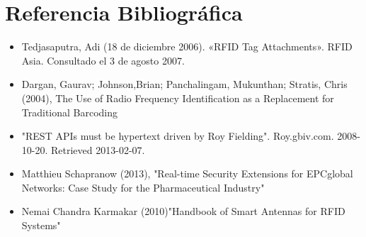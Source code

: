 \documentclass[11pt,twocolumn]{article}
\begin{document}
\section{Referencia Bibliogr\'afica}
	
	\begin{itemize}
		\item  Tedjasaputra, Adi (18 de diciembre 2006). «RFID Tag Attachments». RFID 
		Asia. Consultado el 3 de agosto 2007.
		
		\item Dargan, Gaurav; Johnson,Brian; Panchalingam, Mukunthan; Stratis, 
		Chris (2004), The Use of Radio Frequency Identification as a Replacement for 
		Traditional Barcoding
		
		\item "REST APIs must be hypertext driven by Roy Fielding". Roy.gbiv.com. 
		2008-10-20. Retrieved 2013-02-07.
		
		\item Matthieu Schapranow (2013), "Real-time Security Extensions for EPCglobal
		 Networks: Case Study for the Pharmaceutical Industry"
		 
		 \item Nemai Chandra Karmakar (2010)"Handbook of Smart Antennas for RFID 
		 Systems"
		 
	\end{itemize}
	
\end{document}
